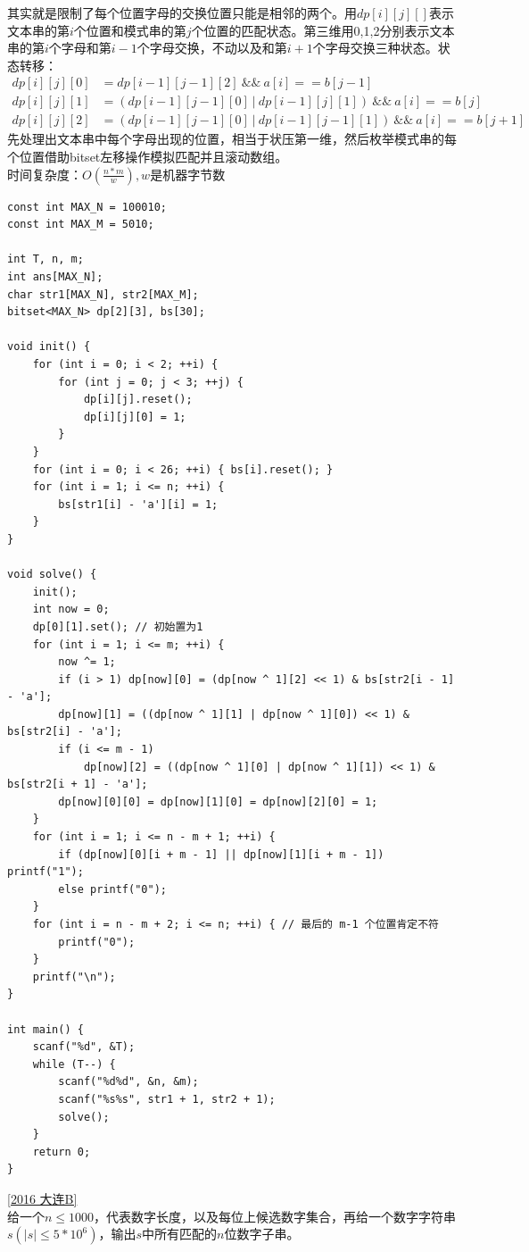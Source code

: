 其实就是限制了每个位置字母的交换位置只能是相邻的两个。用$dp[i][j][]$表示文本串的第$i$个位置和模式串的第$j$个位置的匹配状态。第三维用0,1,2分别表示文本串的第$i$个字母和第$i-1$个字母交换，不动以及和第$i+1$个字母交换三种状态。状态转移：
$$
\begin{aligned}
dp[i][j][0] &= dp[i-1][j-1][2]\  \&\&\ a[i]==b[j-1] \\
dp[i][j][1] &= (dp[i-1][j-1][0]\ |\ dp[i-1][j][1])\ \&\&\ a[i]==b[j] \\
dp[i][j][2] &= (dp[i-1][j-1][0]\ |\ dp[i-1][j-1][1])\ \&\&\  a[i]==b[j+1]
\end{aligned}
$$
先处理出文本串中每个字母出现的位置，相当于状压第一维，然后枚举模式串的每个位置借助bitset左移操作模拟匹配并且滚动数组。 \\
时间复杂度：$O(\frac{n*m}{w}),w$是机器字节数
\begin{lstlisting}
const int MAX_N = 100010;
const int MAX_M = 5010;

int T, n, m;
int ans[MAX_N];
char str1[MAX_N], str2[MAX_M];
bitset<MAX_N> dp[2][3], bs[30];

void init() {
	for (int i = 0; i < 2; ++i) {
		for (int j = 0; j < 3; ++j) {
			dp[i][j].reset();
			dp[i][j][0] = 1;
		}
	}
	for (int i = 0; i < 26; ++i) { bs[i].reset(); }
	for (int i = 1; i <= n; ++i) {
		bs[str1[i] - 'a'][i] = 1;
	}
}

void solve() {
	init();
	int now = 0;
	dp[0][1].set(); // 初始置为1
	for (int i = 1; i <= m; ++i) {
		now ^= 1;
		if (i > 1) dp[now][0] = (dp[now ^ 1][2] << 1) & bs[str2[i - 1] - 'a'];
		dp[now][1] = ((dp[now ^ 1][1] | dp[now ^ 1][0]) << 1) & bs[str2[i] - 'a'];
		if (i <= m - 1)
            dp[now][2] = ((dp[now ^ 1][0] | dp[now ^ 1][1]) << 1) & bs[str2[i + 1] - 'a'];
		dp[now][0][0] = dp[now][1][0] = dp[now][2][0] = 1;
	}
	for (int i = 1; i <= n - m + 1; ++i) {
		if (dp[now][0][i + m - 1] || dp[now][1][i + m - 1]) printf("1");
		else printf("0");
	}
	for (int i = n - m + 2; i <= n; ++i) { // 最后的 m-1 个位置肯定不符
		printf("0");
	}
	printf("\n");
}

int main() {
	scanf("%d", &T);
	while (T--) {
		scanf("%d%d", &n, &m);
		scanf("%s%s", str1 + 1, str2 + 1);
		solve();
	}
	return 0;
}
\end{lstlisting}

\underline{[2016 大连B]} \\
给一个$n\leq 1000$，代表数字长度，以及每位上候选数字集合，再给一个数字字符串$s(|s|\leq 5*10^{6})$，输出$s$中所有匹配的$n$位数字子串。 \\

